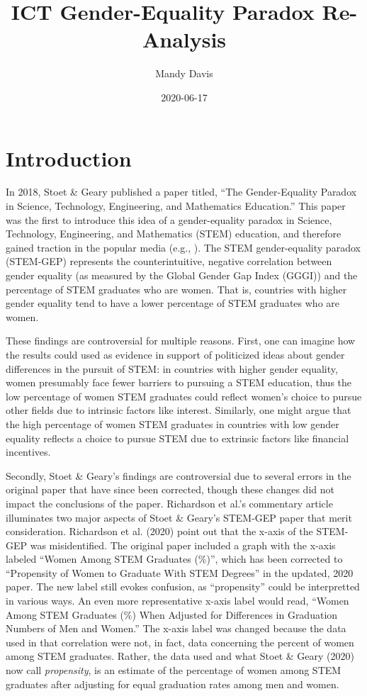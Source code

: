 \documentclass[]{book}
\title{ICT Gender-Equality Paradox Re-Analysis}
\author{Mandy Davis}
\date{2020-06-17}
\begin{document}
\maketitle

{
\setcounter{tocdepth}{1}
\tableofcontents
}
\chapter{Introduction}\label{introduction}

In 2018, Stoet \& Geary published a paper titled, ``The Gender-Equality
Paradox in Science, Technology, Engineering, and Mathematics
Education.'' This paper was the first to introduce this idea of a
gender-equality paradox in Science, Technology, Engineering, and
Mathematics (STEM) education, and therefore gained traction in the
popular media (e.g., \citep{stoetGenderEqualityParadoxScience2018a}).
The STEM gender-equality paradox (STEM-GEP) represents the
counterintuitive, negative correlation between gender equality (as
measured by the Global Gender Gap Index (GGGI)) and the percentage of
STEM graduates who are women. That is, countries with higher gender
equality tend to have a lower percentage of STEM graduates who are
women.

These findings are controversial for multiple reasons. First, one can
imagine how the results could used as evidence in support of politicized
ideas about gender differences in the pursuit of STEM: in countries with
higher gender equality, women presumably face fewer barriers to pursuing
a STEM education, thus the low percentage of women STEM graduates could
reflect women's choice to pursue other fields due to intrinsic factors
like interest. Similarly, one might argue that the high percentage of
women STEM graduates in countries with low gender equality reflects a
choice to pursue STEM due to extrinsic factors like financial
incentives.

Secondly, Stoet \& Geary's findings are controversial due to several
errors in the original paper that have since been corrected, though
these changes did not impact the conclusions of the paper. Richardson et
al.'s \citeyearpar{richardsonThereGenderEqualityParadox2020a} commentary
article illuminates two major aspects of Stoet \& Geary's
\citeyearpar{stoetGenderEqualityParadoxScience2018a} STEM-GEP paper that
merit consideration. Richardson et al. (2020) point out that the x-axis
of the STEM-GEP was misidentified. The original paper included a graph
with the x-axis labeled ``Women Among STEM Graduates (\%)'', which has
been corrected to ``Propensity of Women to Graduate With STEM Degrees''
in the updated, 2020 paper. The new label still evokes confusion, as
``propensity'' could be interpretted in various ways. An even more
representative x-axis label would read, ``Women Among STEM Graduates
(\%) When Adjusted for Differences in Graduation Numbers of Men and
Women.'' The x-axis label was changed because the data used in that
correlation were not, in fact, data concerning the percent of women
among STEM graduates. Rather, the data used and what Stoet \& Geary
(2020) now call \emph{propensity}, is an estimate of the percentage of
women among STEM graduates after adjusting for equal graduation rates
among men and women.
\end{document}
